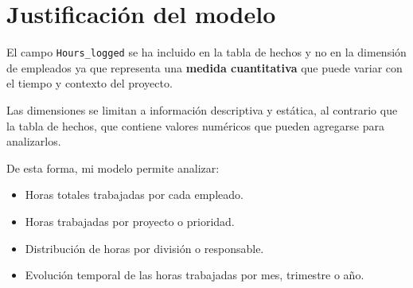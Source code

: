 \documentclass{../../../miPlantilla}
\begin{document}
\newpage

\section{Justificación del modelo}
El campo \texttt{Hours\_logged} se ha incluido en la tabla de hechos y no en la dimensión de empleados
ya que representa una \textbf{medida cuantitativa} que puede variar con el tiempo y contexto del proyecto.

Las dimensiones se limitan a información descriptiva y estática, al contrario que la tabla de hechos,
que contiene valores numéricos que pueden agregarse para analizarlos.

De esta forma, mi modelo permite analizar:

\begin{itemize}
  \item Horas totales trabajadas por cada empleado.
  \item Horas trabajadas por proyecto o prioridad.
  \item Distribución de horas por división o responsable.
  \item Evolución temporal de las horas trabajadas por mes, trimestre o año.
\end{itemize}
\end{document}
